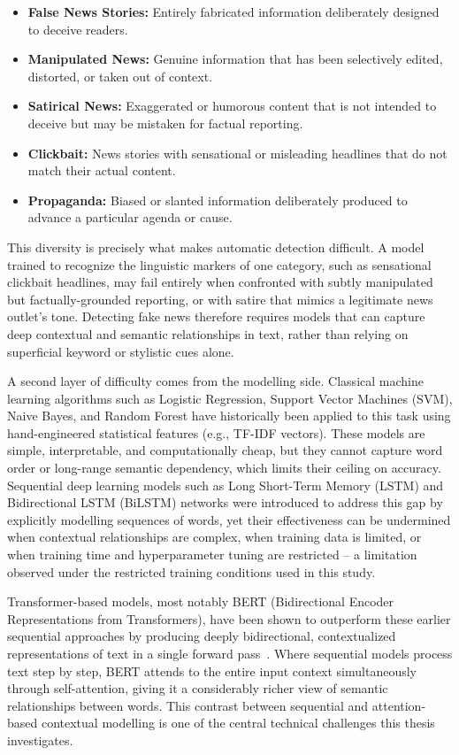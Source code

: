 \begin{itemize}
\item \textbf{False News Stories:} Entirely fabricated information deliberately designed to deceive readers.
\item \textbf{Manipulated News:} Genuine information that has been selectively edited, distorted, or taken out of context.
\item \textbf{Satirical News:} Exaggerated or humorous content that is not intended to deceive but may be mistaken for factual reporting.
\item \textbf{Clickbait:} News stories with sensational or misleading headlines that do not match their actual content.
\item \textbf{Propaganda:} Biased or slanted information deliberately produced to advance a particular agenda or cause.
\end{itemize}

This diversity is precisely what makes automatic detection difficult. A model trained to recognize the linguistic markers of one category, such as sensational clickbait headlines, may fail entirely when confronted with subtly manipulated but factually-grounded reporting, or with satire that mimics a legitimate news outlet's tone. Detecting fake news therefore requires models that can capture deep contextual and semantic relationships in text, rather than relying on superficial keyword or stylistic cues alone.

A second layer of difficulty comes from the modelling side. Classical machine learning algorithms such as Logistic Regression, Support Vector Machines (SVM), Naive Bayes, and Random Forest have historically been applied to this task using hand-engineered statistical features (e.g., TF-IDF vectors). These models are simple, interpretable, and computationally cheap, but they cannot capture word order or long-range semantic dependency, which limits their ceiling on accuracy. Sequential deep learning models such as Long Short-Term Memory (LSTM) and Bidirectional LSTM (BiLSTM) networks were introduced to address this gap by explicitly modelling sequences of words, yet their effectiveness can be undermined when contextual relationships are complex, when training data is limited, or when training time and hyperparameter tuning are restricted -- a limitation observed under the restricted training conditions used in this study.

Transformer-based models, most notably BERT (Bidirectional Encoder Representations from Transformers), have been shown to outperform these earlier sequential approaches by producing deeply bidirectional, contextualized representations of text in a single forward pass~\citep{Kaliyar2021FakeBERT,Mehta2022RecentTrends}. Where sequential models process text step by step, BERT attends to the entire input context simultaneously through self-attention, giving it a considerably richer view of semantic relationships between words. This contrast between sequential and attention-based contextual modelling is one of the central technical challenges this thesis investigates.

